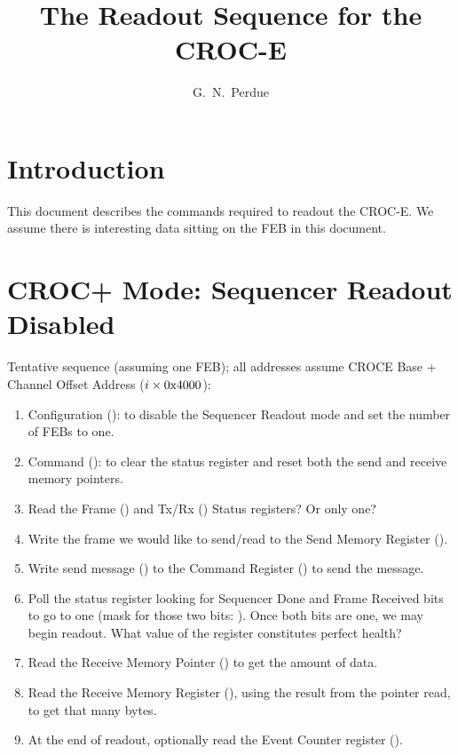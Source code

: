




\linenumbers

\title{The Readout Sequence for the \minerva CROC-E}

\author[1]{G.~N.~Perdue}
\affil[1]{\Rochester}

\maketitle


\section{Introduction}
\label{sec:introduction}

This document describes the commands required to readout the \minerva CROC-E.
We assume there is interesting data sitting on the FEB in this document.

\section{CROC+ Mode: Sequencer Readout Disabled}
\label{sec:seqreaddisab}

Tentative sequence (assuming one FEB); all addresses assume CROCE Base + Channel Offset Address ($i \times \text{0x4000}$):
\begin{enumerate}
\item Configuration ():  to disable the Sequencer Readout mode and set the number of FEBs to one.
\item Command ():  to clear the status register and reset both the send and receive memory pointers.
\item Read the Frame () and Tx/Rx () Status registers? Or only one?
\item Write the frame we would like to send/read to the Send Memory Register (). 
\item Write send message () to the Command Register () to send the message.
\item Poll the status register looking for Sequencer Done and Frame Received bits to go to one (mask for those two bits: ). Once both bits are one, we may begin readout. What value of the register constitutes perfect health?
\item Read the Receive Memory Pointer () to get the amount of data.
\item Read the Receive Memory Register (), using the result from the pointer read, to get that many bytes. 
\item At the end of readout, optionally read the Event Counter register ().
\end{enumerate}


